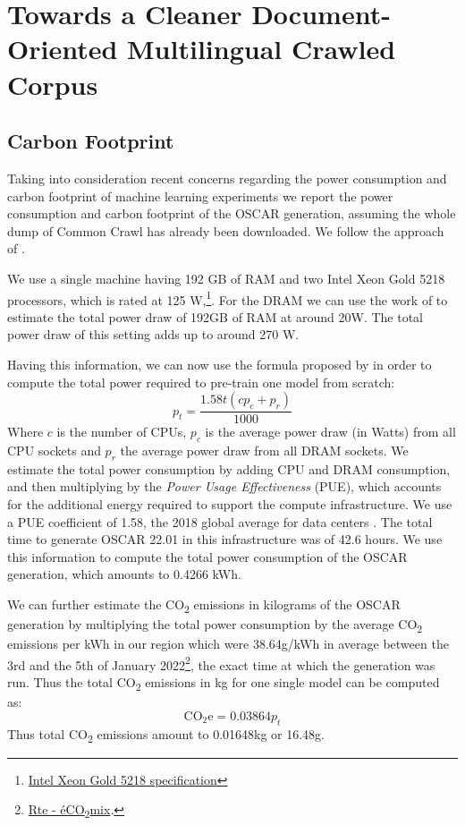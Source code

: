 \chapter{Towards a Cleaner Document-Oriented Multilingual Crawled Corpus}


\section{Carbon Footprint}\label{carbon_footprint_towards}

Taking into consideration recent concerns regarding the power consumption and carbon footprint of machine learning experiments \cite{schwartz-etal-2020-green,bender-etal-2021-on} we report the power consumption and carbon footprint of the OSCAR generation, assuming the whole dump of Common Crawl has already been downloaded. We follow the approach of .

We use a single machine having 192 GB of RAM and two Intel Xeon Gold 5218 processors, which is rated at 125 W,\footnote{\href{https://ark.intel.com/content/www/us/en/ark/products/192444/intel-xeon-gold-5218-processor-22m-cache-2-30-ghz.html}{Intel Xeon Gold 5218 specification}}. For the DRAM we can use the work of  to estimate the total power draw of 192GB of RAM at around 20W. The total power draw of this setting adds up to around 270 W.

Having this information, we can now use the formula proposed by  in order to compute the total power required to pre-train one model from scratch:
\[
    p_t = \frac{1.58t(cp_{c} + p_r)}{1000}
\]
Where $c$ is the number of CPUs, $p_c$ is the average power draw (in Watts) from all CPU sockets and $p_r$ the average power draw from all DRAM sockets. We estimate the total power consumption by adding CPU and DRAM consumption, and then multiplying by the \emph{Power Usage Effectiveness} (PUE), which accounts for the additional energy required to support the compute infrastructure. We use a PUE coefficient of 1.58, the 2018 global average for data centers \cite{strubell-etal-2019-energy}. The total time to generate OSCAR 22.01 in this infrastructure was of 42.6 hours. We use this information to compute the total power consumption of the OSCAR generation, which amounts to 0.4266 \unit{\kWh}.

We can further estimate the CO\textsubscript{2} emissions in kilograms of the OSCAR generation by multiplying the total power consumption by the average CO\textsubscript{2} emissions per \unit{\kWh} in our region which were 38.64\unit{\gram/\kWh} in average between the 3rd and the 5th of January 2022\footnote{\href{https://www.rte-france.com/eco2mix/les-emissions-de-co2-par-kwh-produit-en-france}{Rte - éCO\textsubscript{2}mix}.}, the exact time at which the generation was run. Thus the total CO\textsubscript{2} emissions in kg for one single model can be computed as:
\[
    \text{CO}_{2}\text{e} = 0.03864 p_t
\]
Thus total CO\textsubscript{2} emissions amount to 0.01648\unit{\kilo\gram} or 16.48\unit{\gram}.


